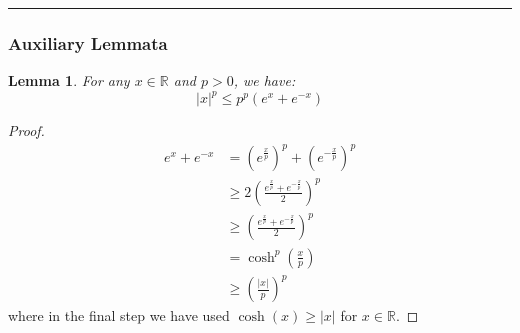\documentclass{article}
\newtheorem{lemma}{Lemma}[subsection]
\theoremstyle{remark}
\newcommand{\comprule}{\textcolor[RGB]{220,220,220}{\rule{\linewidth}{0.2pt}}}
\newcommand{\real}{\mathbb{R}}
\begin{document}
\comprule

\subsubsection{Auxiliary Lemmata}
\begin{lemma}
\label{lem:power-sum-of-exp-bound}
For any \(x \in \real\) and \(p > 0\), we have:
\begin{equation*}
|x|^{p} \leq p^{p}(e^{x} + e^{-x})
\end{equation*}
\end{lemma}

\begin{proof}
\begin{align*}
e^{x} + e^{-x} &= \left(e^{\frac{x}{p}}\right)^{p} + \left(e^{-\frac{x}{p}}\right)^{p} \\
&\geq 2\left(\frac{e^{\frac{x}{p}} + e^{-\frac{x}{p}}}{2}\right)^{p} \\
&\geq \left(\frac{e^{\frac{x}{p}} + e^{-\frac{x}{p}}}{2}\right)^{p} \\
&= \cosh^{p}\left(\frac{x}{p}\right) \\
&\geq \left(\frac{|x|}{p}\right)^{p}
\end{align*}
where in the final step we have used \(\cosh(x) \geq |x|\) for \(x \in \real\).
\end{proof}

\newpage


\end{document}
